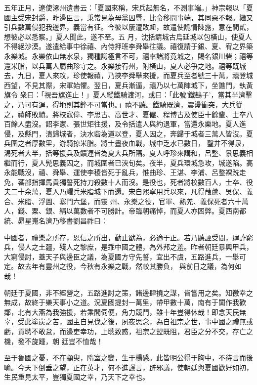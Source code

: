 \begin{pinyinscope}
 五年正月，遼使涿州遺書云：「夏國來稱，宋兵起無名，不測事端。」神宗報以「夏國主受宋封爵，昨邊臣言，秉常見為母黨囚辱，比令移問事端，其同惡不報。繼又引兵數萬侵犯我邊界，義當有征。今彼以屢遭敗衄，故遣使詭情陳露，意在間貳，想彼必以悉察。」夏人聞此，遂不至。五
 月，沈括請城古烏延城以包橫山，使夏人不得絕沙漠。遂遣給事中徐禧、內侍押班李舜舉往議。禧復請于銀、夏、宥之界築永樂城。永樂依山無水泉，獨種諤極言不可，禧率諸將竟城之，賜名銀川砦；禧等還米脂，以兵萬人屬曲珍守之。永樂接宥州，附橫山，夏人必爭之地。禧等既城去，九日，夏人來攻，珍使報禧，乃挾李舜舉來援，而夏兵至者號三十萬，禧登城西望，不見其際，宋軍始懼。翌日，夏兵漸逼，禧乃以七萬陣城下，坐譙門，執黃旗令
 衆曰：「視吾旗進止！」夏人縱鐵騎渡河，或曰：「此號'鐵鷂子'，當其半濟擊之，乃可有逞，得地則其鋒不可當也。」禧不聽。鐵騎既濟，震盪衝突，大兵從之，禧師敗績。將校寇偉、李思古、高世才、夏儼、程博古及使臣十餘輩、士卒八百餘人盡沒。詔李憲、張世矩往援，及令括遣人與約退軍，當還永樂地。夏人進侵，及縣門，潰歸城者，決水砦為道以登，夏人因之，奔歸于城者三萬人皆沒。夏兵圍之者厚數里，游騎掠米脂。將士晝夜血戰，城中乏水已數日，
 鑿井不得泉，渴死者大半，括等援兵及饋運皆為夏大兵所隔。夏人呼珍來講和，呂整、景思義相繼而行，夏人髡思義囚之，而城圍者已浹旬矣。夜半，夏兵環城急攻，城遂陷。高永能戰沒，禧、舜舉、運使李稷皆死于亂兵，惟曲珍、王湛、李浦、呂整裸跣走免，蕃部指揮馬貴獨誓死持刀殺數十人而沒。是役也，死者將校數百人，士卒、役夫二十余萬，夏人乃耀兵米脂城下而還。宋自熙寧用兵以來，凡得葭蘆、吳保、義合、米脂、浮圖、塞門六堡，而靈
 州、永樂之役，官軍、熟羌、義保死者六十萬人，錢、粟、銀、絹以萬數者不可勝計。帝臨朝痛悼，而夏人亦困弊。夏西南都統、昴星嵬名濟乃移書劉昌祚曰：



 中國者，禮樂之所存，恩信之所出，動止猷為，必適于正。若乃聽誣受間，肆詐窮兵，侵人之土疆，殘人之黎庶，是乖中國之體，為外邦之羞。昨者朝廷暴興甲兵，大窮侵討，蓋天子與邊臣之議，為夏國方守先誓，宜出不虞，五路進兵，一舉可定。故去年有靈州之役，今秋有永樂之戰，然較其勝負，
 與前日之議，為何如哉！



 朝廷于夏國，非不經營之，五路進討之策，諸邊肆撓之謀，皆嘗用之矣。知徼幸之無成，故終于樂天事小之道。況夏國提封一萬里，帶甲數十萬，南有于闐作我歡鄰，北有大燕為我強援，若乘間伺便，角力競鬥，雖十年豈得休哉！即念天民無辜，受此塗炭之苦，國主自見伐之後，夙夜思念，為自祖宗之世，事中國之禮無或虧，貢聘不敢怠，而邊吏幸功，上聰致惑，祖宗之盟既阻，君臣之分不交，存亡之機，發不旋踵，朝
 廷豈不恤哉！



 至于魯國之憂，不在顓臾，隋室之變，生于楊感。此皆明公得于胸中，不待言而後喻。今天下倒垂之望，正在英才，何不進讜言，辟邪議，使朝廷與夏國歡好如初，生民重見太平，豈獨夏國之幸，乃天下之幸也。




\end{pinyinscope}
